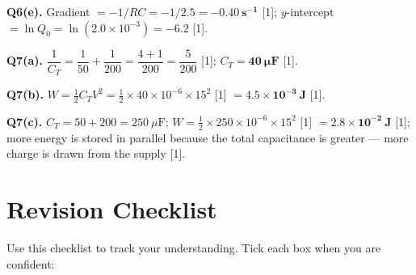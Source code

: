 \begin{markscheme}
\vspace{0.5em}\textbf{Q6(e).} Gradient $= -1/RC = -1/2.5 = \mathbf{-0.40\ \text{s}^{-1}}$ [1]; $y$-intercept $= \ln Q_0 = \ln(2.0\times10^{-3}) = \mathbf{-6.2}$ [1].

\vspace{0.5em}\textbf{Q7(a).} $\dfrac{1}{C_T} = \dfrac{1}{50} + \dfrac{1}{200} = \dfrac{4+1}{200} = \dfrac{5}{200}$ [1]; $C_T = \mathbf{40\ \mu\text{F}}$ [1].

\vspace{0.5em}\textbf{Q7(b).} $W = \tfrac{1}{2}C_T V^2 = \tfrac{1}{2}\times40\times10^{-6}\times15^2$ [1] $= \mathbf{4.5\times10^{-3}\ \text{J}}$ [1].

\vspace{0.5em}\textbf{Q7(c).} $C_T = 50+200 = 250\ \mu\text{F}$; $W = \tfrac{1}{2}\times250\times10^{-6}\times15^2$ [1] $= \mathbf{2.8\times10^{-2}\ \text{J}}$ [1]; more energy is stored in parallel because the total capacitance is greater — more charge is drawn from the supply [1].

\end{markscheme}

\newpage
\section{Revision Checklist}

Use this checklist to track your understanding. Tick each box when you are confident:


